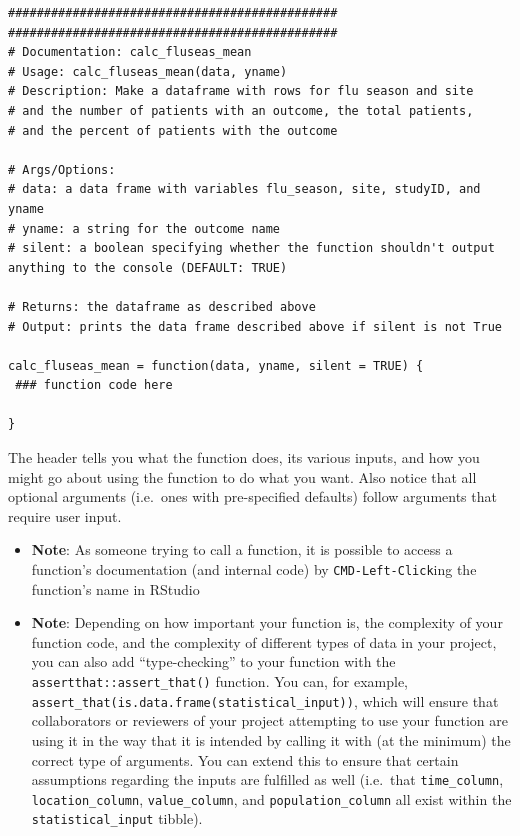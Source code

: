 \documentclass[
]{book}
\begin{document}
\begin{verbatim}
##############################################
##############################################
# Documentation: calc_fluseas_mean
# Usage: calc_fluseas_mean(data, yname)
# Description: Make a dataframe with rows for flu season and site
# and the number of patients with an outcome, the total patients,
# and the percent of patients with the outcome

# Args/Options:
# data: a data frame with variables flu_season, site, studyID, and yname
# yname: a string for the outcome name
# silent: a boolean specifying whether the function shouldn't output anything to the console (DEFAULT: TRUE)

# Returns: the dataframe as described above
# Output: prints the data frame described above if silent is not True

calc_fluseas_mean = function(data, yname, silent = TRUE) {
 ### function code here 

}
\end{verbatim}

The header tells you what the function does, its various inputs, and how you might go about using the function to do what you want. Also notice that all optional arguments (i.e.~ones with pre-specified defaults) follow arguments that require user input.

\begin{itemize}
\item
  \textbf{Note}: As someone trying to call a function, it is possible to access a function's documentation (and internal code) by \texttt{CMD-Left-Click}ing the function's name in RStudio
\item
  \textbf{Note}: Depending on how important your function is, the complexity of your function code, and the complexity of different types of data in your project, you can also add ``type-checking'' to your function with the \texttt{assertthat::assert\_that()} function. You can, for example, \texttt{assert\_that(is.data.frame(statistical\_input))}, which will ensure that collaborators or reviewers of your project attempting to use your function are using it in the way that it is intended by calling it with (at the minimum) the correct type of arguments. You can extend this to ensure that certain assumptions regarding the inputs are fulfilled as well (i.e.~that \texttt{time\_column}, \texttt{location\_column}, \texttt{value\_column}, and \texttt{population\_column} all exist within the \texttt{statistical\_input} tibble).
\end{itemize}
\end{document}
